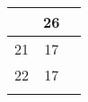 {\begin{tabularx}{\textwidth}{p{.1em}cc}
\begin{tabular}[t]{cc}
\multicolumn{1}{|c|}{23}                                                        & \multicolumn{1}{c|}{26}                                                             \\ \hline
\multicolumn{1}{|c|}{21}                                                        & \multicolumn{1}{c|}{17}                                                             \\ \hline
\multicolumn{1}{|c|}{22}                                                        & \multicolumn{1}{c|}{17}                                                             \\ \hline
\end{tabular}

\end{tabularx}}